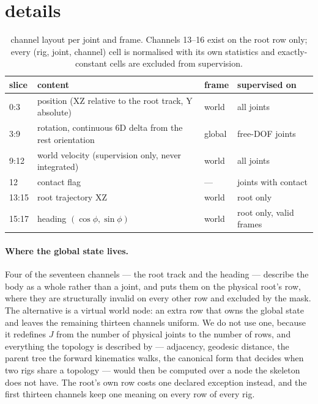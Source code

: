 \appendix

\section{\rep{} details}\label{app:rep}

\begin{table}[t]
\centering\small
\caption{\rep{} channel layout per joint and frame. Channels 13--16 exist on the root row only; every
(rig, joint, channel) cell is normalised with its own statistics and exactly-constant cells are
excluded from supervision.}
\label{tab:channels}
\begin{tabular}{@{}llll@{}}
\toprule
slice & content & frame & supervised on \\
\midrule
0:3   & position (XZ relative to the root track, Y absolute) & world & all joints \\
3:9   & rotation, continuous 6D delta from the rest orientation & global & free-DOF joints \\
9:12  & world velocity (supervision only, never integrated) & world & all joints \\
12    & contact flag & --- & joints with contact \\
13:15 & root trajectory XZ & world & root only \\
15:17 & heading $(\cos\phi,\sin\phi)$ & world & root only, valid frames \\
\bottomrule
\end{tabular}
\end{table}


\paragraph{Where the global state lives.} Four of the seventeen channels --- the root track and the heading ---
describe the body as a whole rather than a joint, and \rep{} puts them on the physical root's row, where they are
structurally invalid on every other row and excluded by the mask. The alternative is a virtual world node: an
extra row that owns the global state and leaves the remaining thirteen channels uniform. We do not use one,
because it redefines $J$ from the number of physical joints to the number of rows, and everything the topology is
described by --- adjacency, geodesic distance, the parent tree the forward kinematics walks, the canonical form
that decides when two rigs share a topology --- would then be computed over a node the skeleton does not have.
The root's own row costs one declared exception instead, and the first thirteen channels keep one meaning on
every row of every rig.

